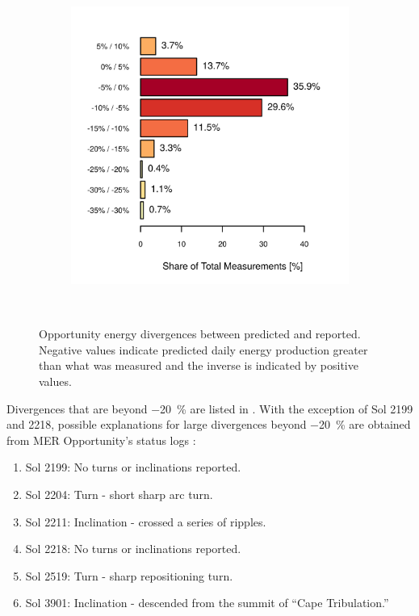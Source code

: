 \begin{figure}[h]
\begin{subfigure}[t]{\subfigureWidth}
            \includegraphics[height=\graphicsHeight]{sections/mars-solar-energy/photovoltaic-energy/plots/binned-error-margins.png}
            \label{fig:plot:binned-error-margins}
    \end{subfigure}\\[0.8ex]
    \caption[Opportunity energy divergences between predicted and reported]
    {Opportunity energy divergences between predicted and reported. Negative values indicate predicted daily energy production greater than what was measured and the inverse is indicated by positive values.}
    \label{fig:plot:energy-divergence}
\vspace{-2ex}
\end{figure}

\vspace{0.5cm}

Divergences that are beyond \SI{-20}{\percent} are listed in . With the exception of Sol 2199 and 2218, possible explanations for large divergences beyond \SI{-20}{\percent} are obtained from \ac{MER} Opportunity's status logs :

\begin{enumerate}[label=\textcolor{BulletBlue}{(\alph*)}]
  \item Sol 2199: No turns or inclinations reported.
  \item Sol 2204: Turn - short sharp arc turn.
  \item Sol 2211: Inclination - crossed a series of ripples.
  \item Sol 2218: No turns or inclinations reported.
  \item Sol 2519: Turn - sharp repositioning turn.
  \item Sol 3901: Inclination - descended from the summit of ``Cape Tribulation.''
\end{enumerate}

